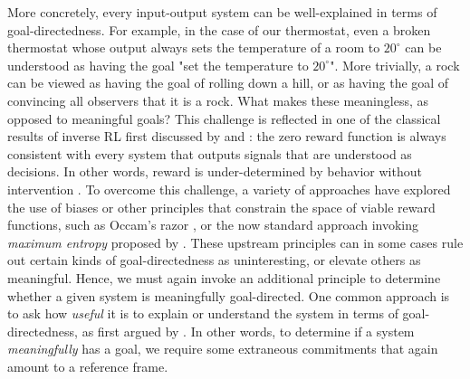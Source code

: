 \documentclass[11pt]{article} %
\begin{document}
%
More concretely, every input-output system can be well-explained in terms of goal-directedness. For example, in the case of our thermostat, even a broken thermostat whose output always sets the temperature of a room to $20^\circ$ can be understood as having the goal "set the temperature to $20^\circ$". More trivially, a rock can be viewed as having the goal of rolling down a hill, or as having the goal of convincing all observers that it is a rock. What makes these meaningless, as opposed to meaningful goals? 
%
This challenge is reflected in one of the classical results of inverse RL first discussed by \cite{russell1998learning} and \cite{ng2000algorithms}: the zero reward function is always consistent with every system that outputs signals that are understood as decisions. In other words, reward is under-determined by behavior \citep{cao2021identifiability} without intervention \citep{amin2017repeated}. To overcome this challenge, a variety of approaches have explored the use of biases or other principles that constrain the space of viable reward functions, such as Occam's razor \citep{armstrong2018occam}, or the now standard approach invoking \textit{maximum entropy} proposed by \cite{ziebart2008maximum}. These upstream principles can in some cases rule out certain kinds of goal-directedness as uninteresting, or elevate others as meaningful. Hence, we must again invoke an additional principle to determine whether a given system is meaningfully goal-directed. One common approach is to ask how \textit{useful} it is to explain or understand the system in terms of goal-directedness, as first argued by \cite{dennett1989intentional}. %
%
In other words, to determine if a system \textit{meaningfully} has a goal, we require some extraneous commitments that again amount to a reference frame.
\end{document}
